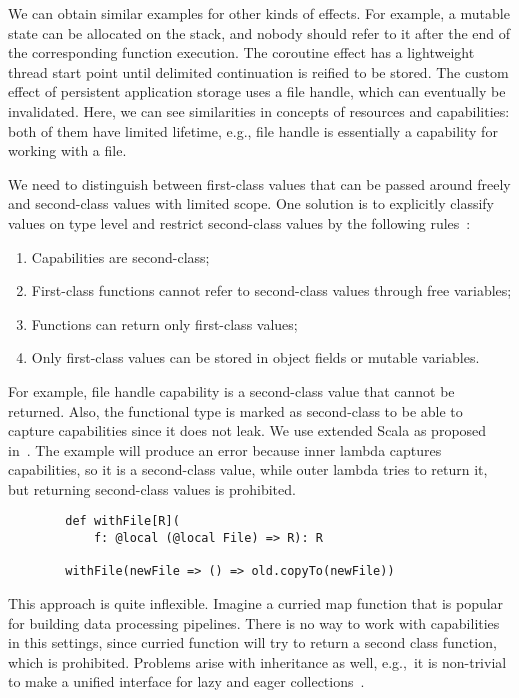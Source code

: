 \documentclass[conference]{IEEEtran}
\begin{document}
    We can obtain similar examples for other kinds of effects.
    For example, a mutable state can be allocated on the stack, and nobody should refer to it after the end of the corresponding function execution.
    The coroutine effect has a lightweight thread start point until delimited continuation is reified to be stored.
    The custom effect of persistent application storage uses a file handle, which can eventually be invalidated.
    Here, we can see similarities in concepts of resources and capabilities: both of them have limited lifetime, e.g., file handle is essentially a capability for working with a file.

    We need to distinguish between first-class values that can be passed around freely and second-class values with limited scope.
    One solution is to explicitly classify values on type level and restrict second-class values by the following rules~\cite{osvald2016gentrification}:
    \begin{enumerate}
        \item Capabilities are second-class;
        \item First-class functions cannot refer to second-class values through free variables;
        \item Functions can return only first-class values;
        \item Only first-class values can be stored in object fields or mutable variables.
    \end{enumerate}

    For example, file handle capability is a second-class value that cannot be returned.
    Also, the functional type is marked as second-class to be able to capture capabilities since it does not leak.
    We use extended Scala as proposed in~\cite{osvald2016gentrification}.
    The example will produce an error because inner lambda captures capabilities, so it is a second-class value, while outer lambda tries to return it, but returning second-class values is prohibited.
    \begin{verbatim}
        def withFile[R](
            f: @local (@local File) => R): R

        withFile(newFile => () => old.copyTo(newFile))
    \end{verbatim}

    This approach is quite inflexible.
    Imagine a curried map function that is popular for building data processing pipelines.
    There is no way to work with capabilities in this settings, since curried function will try to return a second class function, which is prohibited.
    Problems arise with inheritance as well, e.g.,\ it is non-trivial to make a unified interface for lazy and eager collections~\cite{osvald2016gentrification}.
\end{document}
